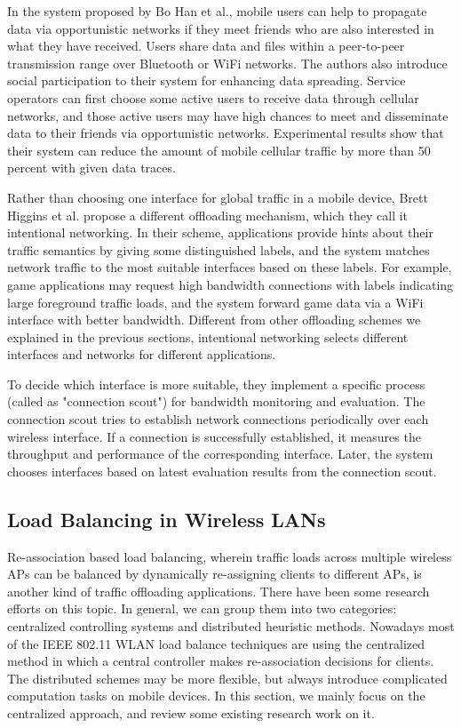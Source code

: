 \documentclass[english]{tktltiki}
\begin{document}
In the system proposed by Bo Han et al., mobile users can help to propagate data via opportunistic networks if they meet friends who are also interested in what they have received. Users share data and files within a peer-to-peer transmission range over Bluetooth or WiFi networks. The authors also introduce social participation to their system for enhancing data spreading. Service operators can first choose some active users to receive data through cellular networks, and those active users may have high chances to meet and disseminate data to their friends via opportunistic networks. Experimental results show that their system can reduce the amount of mobile cellular traffic by more than 50 percent with given data traces.

Rather than choosing one interface for global traffic in a mobile device, Brett Higgins et al. \cite{hra+10} propose a different offloading mechanism, which they call it intentional networking. In their scheme, applications provide hints about their traffic semantics by giving some distinguished labels, and the system matches network traffic to the most suitable interfaces based on these labels. For example, game applications may request high bandwidth connections with labels indicating large foreground traffic loads, and the system forward game data via a WiFi interface with better bandwidth. Different from other offloading schemes we explained in the previous sections, intentional networking selects different interfaces and networks for different applications.

To decide which interface is more suitable, they implement a specific process (called as "connection scout") for bandwidth monitoring and evaluation. The connection scout tries to establish network connections periodically over each wireless interface. If a connection is successfully established, it measures the throughput and performance of the corresponding interface. Later, the system chooses interfaces based on latest evaluation results from the connection scout.

\subsection{Load Balancing in Wireless LANs}

Re-association based load balancing, wherein traffic loads across multiple wireless APs can be balanced by dynamically re-assigning clients to different APs, is another kind of traffic offloading applications. There have been some research efforts on this topic. In general, we can group them into two categories: centralized controlling systems and distributed heuristic methods. Nowadays most of the IEEE 802.11 WLAN load balance techniques are using the centralized method in which a central controller makes re-association decisions for clients. The distributed schemes may be more flexible, but always introduce complicated computation tasks on mobile devices. In this section, we mainly focus on the centralized approach, and review some existing research work on it.
\end{document}
